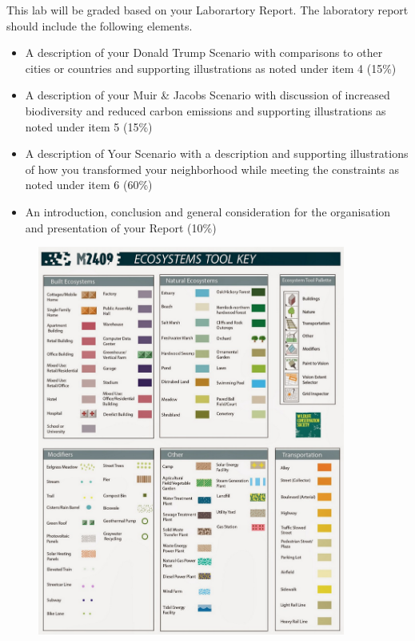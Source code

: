 \documentclass{article}
\begin{document}
\setlength{\leftskip}{1cm}

\setlength{\parindent}{0cm}

This lab will be graded based on your Laborartory Report.  The laboratory report should include the following elements.

\begin{itemize}[leftmargin=15mm]

\item A description of your Donald Trump Scenario with comparisons to other cities or countries and supporting illustrations as noted under item 4 (15\%)

\item A description of your Muir \& Jacobs Scenario with discussion of increased biodiversity and reduced carbon emissions and supporting illustrations as noted under item 5 (15\%)

\item A description of Your Scenario with a description and supporting illustrations of how you transformed your neighborhood while meeting the constraints as noted under item 6 (60\%)

\item An introduction, conclusion and general consideration for the organisation and presentation of your Report (10\%)

\end{itemize}

\begin{center}
\begin{figure}[t!]
\includegraphics[width=0.9\textwidth]{key.png}
\end{figure}
\end{center}

\end{document}
